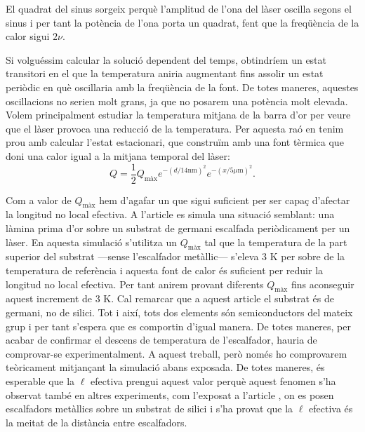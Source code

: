 \documentclass{article}
\begin{document}
El quadrat del sinus sorgeix perqu\`{e} l'amplitud de l'ona del l\`{a}ser oscil\textperiodcentered la segons el sinus i per tant la pot\`{e}ncia de l'ona porta un quadrat, fent que la freq\"{u}\`{e}ncia de la calor sigui $2\nu$.

Si volgu\'{e}ssim calcular la soluci\'{o} dependent del temps, obtindr\'{i}em un estat transitori en el que la temperatura aniria augmentant fins assolir un estat peri\`{o}dic en qu\`{e} oscil\textperiodcentered laria amb la freq\"{u}\`{e}ncia de la font. De totes maneres, aquestes oscil\textperiodcentered lacions no serien molt grans, ja que no posarem una pot\`{e}ncia molt elevada. Volem principalment estudiar la temperatura mitjana de la barra d'or per veure que el l\`{a}ser provoca una reducci\'{o} de la temperatura. Per aquesta ra\'{o} en tenim prou amb calcular l'estat estacionari, que constru\"{i}m amb una font t\`{e}rmica que doni una calor igual a la mitjana temporal del l\`{a}ser:
\[Q=\frac 1 2Q_{\text{m\`{a}x}}e^{-(d/14\text{nm})^2}e^{-(x/5\mu\text{m})^2}.\]

Com a valor de $Q_{\text{m\`{a}x}}$ hem d'agafar un que sigui suficient per ser capa\c{c} d'afectar la longitud no local efectiva. A l'article \cite{beardo2020phonon} es simula una situaci\'{o} semblant: una l\`{a}mina prima d'or sobre un substrat de germani escalfada peri\`{o}dicament
per un l\`{a}ser. En aquesta simulaci\'{o} s'utilitza un $Q_{\text{m\`{a}x}}$ tal que la temperatura de la part superior del substrat ---sense l'escalfador met\`{a}l\textperiodcentered lic--- s'eleva 3 K per sobre de la temperatura de refer\`{e}ncia i aquesta font de calor \'{e}s suficient per reduir la longitud no local efectiva. Per tant anirem provant diferents $Q_{\text{m\`{a}x}}$ fins aconseguir aquest increment de 3 K. Cal remarcar que a aquest article el substrat \'{e}s de germani, no de silici. Tot i aix\'{i}, tots dos elements s\'{o}n semiconductors del mateix grup i per tant s'espera que es comportin d'igual manera. De totes maneres, per acabar de confirmar el descens de temperatura de l'escalfador, hauria de comprovar-se experimentalment. A aquest treball, per\`{o} nom\'{e}s ho comprovarem te\`{o}ricament mitjan\c{c}ant la simulaci\'{o} abans exposada. De totes maneres, \'{e}s esperable que la $\ell$ efectiva prengui aquest valor perqu\`{e} aquest fenomen s'ha observat tamb\'{e} en altres experiments, com l'exposat a l'article \cite{beardo2021general}, on es posen escalfadors met\`{a}l\textperiodcentered lics sobre un substrat de silici i s'ha provat que la $\ell$ efectiva \'{e}s la meitat de la dist\`{a}ncia entre escalfadors.
\end{document}
